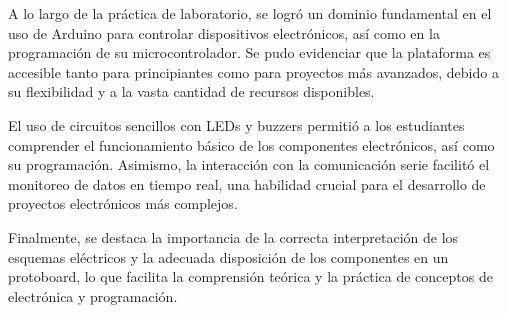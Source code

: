 A lo largo de la práctica de laboratorio, se logró un dominio fundamental en el uso de Arduino para controlar dispositivos electrónicos, así como en la programación de su microcontrolador. Se pudo evidenciar que la plataforma es accesible tanto para principiantes como para proyectos más avanzados, debido a su flexibilidad y a la vasta cantidad de recursos disponibles.

El uso de circuitos sencillos con LEDs y buzzers permitió a los estudiantes comprender el funcionamiento básico de los componentes electrónicos, así como su programación. Asimismo, la interacción con la comunicación serie facilitó el monitoreo de datos en tiempo real, una habilidad crucial para el desarrollo de proyectos electrónicos más complejos.

Finalmente, se destaca la importancia de la correcta interpretación de los esquemas eléctricos y la adecuada disposición de los componentes en un protoboard, lo que facilita la comprensión teórica y la práctica de conceptos de electrónica y programación.